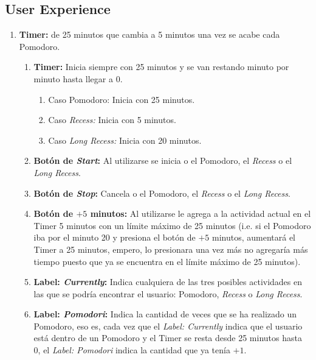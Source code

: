 \documentclass[]{article}
\begin{document}
\subsection{User Experience}
\begin{enumerate}
	\item \textbf{Timer:} de 25 minutos que cambia a 5 minutos una vez se acabe cada Pomodoro.
	\begin{enumerate}
		\item \textbf{Timer:} Inicia siempre con 25 minutos y se van restando minuto por minuto hasta llegar a 0.
		\begin{enumerate}
			\item Caso Pomodoro: Inicia con 25 minutos.
			\item Caso \textit{Recess:} Inicia con 5 minutos.
			\item Caso \textit{Long Recess:} Inicia con 20 minutos.
		\end{enumerate}
		\item \textbf{Botón de \textit{Start}:} Al utilizarse se inicia o el Pomodoro, el \textit{Recess} o el \textit{Long Recess}.
		\item \textbf{Botón de \textit{Stop}:} Cancela o el Pomodoro, el \textit{Recess} o el \textit{Long Recess}.
		
		\item \textbf{Botón de $+5$ minutos:} Al utilizarse le agrega a la actividad actual en el Timer 5 minutos con un límite máximo de 25 minutos (i.e. si el Pomodoro iba por el minuto 20 y presiona el botón de $+5$ minutos, aumentará el Timer a 25 minutos, empero, lo presionara una vez más no agregaría más tiempo puesto que ya se encuentra en el límite máximo de 25 minutos).
		
		\item \textbf{Label: \textit{Currently}:} Indica cualquiera de las tres posibles actividades en las que se podría encontrar el usuario: Pomodoro, \textit{Recess} o \textit{Long Recess}.
		
		\item \textbf{Label: \textit{Pomodori}:} Indica la cantidad de veces que se ha realizado un Pomodoro, eso es, cada vez que el \textit{Label: Currently} indica que el usuario está dentro de un Pomodoro y el Timer se resta desde 25 minutos hasta 0, el \textit{Label: Pomodori} indica la cantidad que ya tenía $+1$.
		

\end{enumerate}
\end{enumerate}
\end{document}

